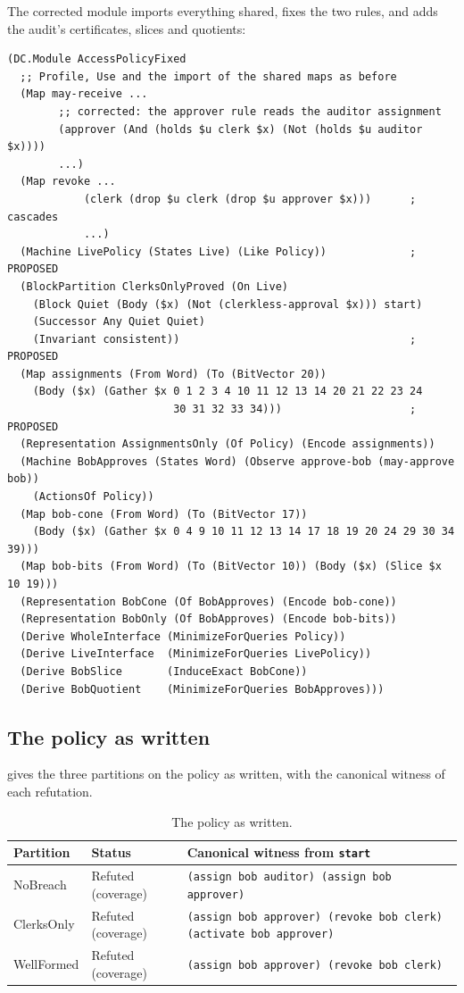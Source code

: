 \documentclass[11pt]{article}
\newcommand{\code}[1]{\texttt{#1}}
\theoremstyle{definition}
\theoremstyle{plain}
\begin{document}
The corrected module imports everything shared, fixes the two rules, and adds the audit's
certificates, slices and quotients:
\begin{lstlisting}
(DC.Module AccessPolicyFixed
  ;; Profile, Use and the import of the shared maps as before
  (Map may-receive ...
        ;; corrected: the approver rule reads the auditor assignment
        (approver (And (holds $u clerk $x) (Not (holds $u auditor $x))))
        ...)
  (Map revoke ...
            (clerk (drop $u clerk (drop $u approver $x)))      ; cascades
            ...)
  (Machine LivePolicy (States Live) (Like Policy))             ; PROPOSED
  (BlockPartition ClerksOnlyProved (On Live)
    (Block Quiet (Body ($x) (Not (clerkless-approval $x))) start)
    (Successor Any Quiet Quiet)
    (Invariant consistent))                                    ; PROPOSED
  (Map assignments (From Word) (To (BitVector 20))
    (Body ($x) (Gather $x 0 1 2 3 4 10 11 12 13 14 20 21 22 23 24
                          30 31 32 33 34)))                    ; PROPOSED
  (Representation AssignmentsOnly (Of Policy) (Encode assignments))
  (Machine BobApproves (States Word) (Observe approve-bob (may-approve bob))
    (ActionsOf Policy))
  (Map bob-cone (From Word) (To (BitVector 17))
    (Body ($x) (Gather $x 0 4 9 10 11 12 13 14 17 18 19 20 24 29 30 34 39)))
  (Map bob-bits (From Word) (To (BitVector 10)) (Body ($x) (Slice $x 10 19)))
  (Representation BobCone (Of BobApproves) (Encode bob-cone))
  (Representation BobOnly (Of BobApproves) (Encode bob-bits))
  (Derive WholeInterface (MinimizeForQueries Policy))
  (Derive LiveInterface  (MinimizeForQueries LivePolicy))
  (Derive BobSlice       (InduceExact BobCone))
  (Derive BobQuotient    (MinimizeForQueries BobApproves)))
\end{lstlisting}

\subsection{The policy as written}

 gives the three partitions on the policy as written, with the canonical
witness of each refutation.

\begin{table}[ht]
\centering\small
\begin{tabularx}{\textwidth}{ll>{\raggedright\arraybackslash}X}
\toprule
Partition & Status & Canonical witness from \code{start}\\
\midrule
NoBreach & Refuted (coverage) & \code{(assign bob auditor) (assign bob approver)}\\
ClerksOnly & Refuted (coverage) & \code{(assign bob approver) (revoke bob clerk) (activate bob approver)}\\
WellFormed & Refuted (coverage) & \code{(assign bob approver) (revoke bob clerk)}\\
\bottomrule
\end{tabularx}
\caption{The policy as written.}\label{tab:ex2written}
\end{table}
\end{document}
